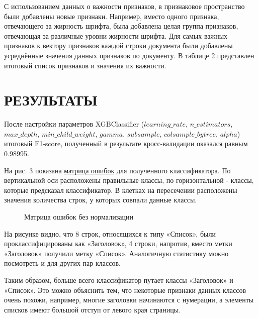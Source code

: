 \documentclass[10pt, a4paper]{ieeeconf}
\begin{document}
С использованием данных о важности признаков, в признаковое пространство были добавлены новые признаки. Например, вместо одного признака, отвечающего за жирность шрифта, была добавлена целая группа признаков, отвечающая за различные уровни жирности шрифта. Для самых важных признаков к вектору признаков каждой строки документа были добавлены усреднённые значения данных признаков по документу. В таблице 2 представлен итоговый список признаков и значения их важности.

\section{РЕЗУЛЬТАТЫ}

После настройки параметров XGBClassifier ($learning\_rate$, $n\_estimators$, $max\_depth$, $min\_child\_weight$,
$gamma$, $subsample$, $colsample\_bytree$, $alpha$) итоговый F1-score, полученный в результате кросс-валидации оказался равным 0.98995. 

На рис. 3 показана \href{https://en.wikipedia.org/wiki/Confusion_matrix}{матрица ошибок} для полученного классификатора. По вертикальной оси расположены правильные классы, по горизонтальной - классы, которые предсказал классификатор. В клетках на пересечении расположены значения количества строк, у которых совпали данные классы.

\begin{figure}[ht]
  \caption{Матрица ошибок без нормализации}
\end{figure}

На рисунке видно, что 8 строк, относящихся к типу «Список», были проклассифицированы как «Заголовок», 4 строки, напротив, вместо метки «Заголовок» получили метку «Список». Аналогичную статистику можно посмотреть и для других пар классов.

Таким образом, больше всего классификатор путает классы «Заголовок» и «Список». Это можно объяснить тем, что некоторые признаки данных классов очень похожи, например, многие заголовки начинаются с нумерации, а элементы списков имеют большой отступ от левого края страницы.
\end{document}
